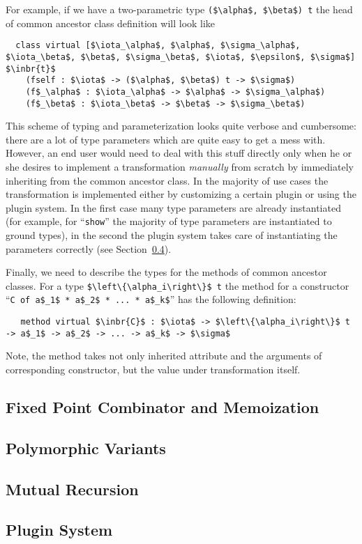 For example, if we have a two-parametric type \lstinline{($\alpha$, $\beta$) t} the head of common ancestor class definition will look like

\begin{lstlisting}
  class virtual [$\iota_\alpha$, $\alpha$, $\sigma_\alpha$, $\iota_\beta$, $\beta$, $\sigma_\beta$, $\iota$, $\epsilon$, $\sigma$] $\inbr{t}$
    (fself : $\iota$ -> ($\alpha$, $\beta$) t -> $\sigma$)
    (f$_\alpha$ : $\iota_\alpha$ -> $\alpha$ -> $\sigma_\alpha$)
    (f$_\beta$ : $\iota_\beta$ -> $\beta$ -> $\sigma_\beta$)
\end{lstlisting}

This scheme of typing and parameterization looks quite verbose and cumbersome: there are a lot of type parameters which are quite easy to get a mess with. However, an end
user would need to deal with this stuff directly only when he or she desires to implement a transformation \emph{manually} from scratch by immediately inheriting from the common ancestor class.
In the majority of use cases the transformation is implemented either by customizing a certain plugin or using the plugin system. In the first case many
type parameters are already instantiated (for example, for ``\lstinline{show}'' the majority of type parameters are instantiated to ground types), in the
second the plugin system takes care of instantiating the parameters correctly (see Section~\ref{plugins}).

Finally, we need to describe the types for the methods of common ancestor classes. For a type \lstinline|$\left\{\alpha_i\right\}$ t| the method for a
 constructor ``\lstinline|C of a$_1$ * a$_2$ * ... * a$_k$|'' has the following definition:

\begin{lstlisting}
   method virtual $\inbr{C}$ : $\iota$ -> $\left\{\alpha_i\right\}$ t -> a$_1$ -> a$_2$ -> ... -> a$_k$ -> $\sigma$
\end{lstlisting}

Note, the method takes not only inherited attribute and the arguments of corresponding constructor, but the value under transformation itself.

\subsection{Fixed Point Combinator and Memoization}

\subsection{Polymorphic Variants}
\label{pv}

\subsection{Mutual Recursion}
\subsection{Plugin System}
\label{plugins}
